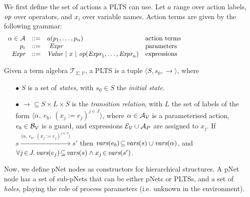 \documentclass[smallcondensed]{svjour3}
\newcommand{\noteSB}[2][color=green!40, size=\tiny]{\todo[#1]{{\bf Simon: } {#2}}}
\newcommand{\cT}{\ensuremath{\mathcal{T}}}
\newcommand{\cV}{\ensuremath{\mathcal{V}}}
\newcommand{\signature}{\ensuremath{\Sigma}}
\newcommand{\variables}{\ensuremath{\cV}}
\newcommand{\Talg}{\ensuremath{\cT_{\signature,\variables}}}
\def\AlgE{\mathcal{E}}
\def\AlgA{\mathcal{A}}
\def\AlgB{\mathcal{B}}
\begin{document}
We first define the set of actions a PLTS can use.  Let $a$
range over action labels, $\symb{op}$ over operators, and $x_i$  over
variable names. Action terms are given by the following grammar:
\[
\begin{array}[l]{rcl@{\quad}p{5.5cm}}
\alpha\in\AlgA&::=&a(p_1,\ldots,p_n)&\text{action terms}\\
p_i&::=& ~\symb{Expr}&\text{parameters}\\
\symb{Expr}&::=& \symb{Value}~|~x~|~\symb{op}(\symb{Expr}_1,\dots,\symb{Expr}_n)&\text{expressions}
\end{array}
\]

\begin{definition}[PLTS]
	\label{PLTS}
	Given a term algebra $\Talg$, a PLTS is a tuple
	$\langle S,s_0, \to\rangle$, where
	\begin{itemize}
		\item[$\bullet$]
		$S$ is a set of \emph{states}, with $s_0 \in S$ the \emph{initial state}.
		\item[$\bullet$] $\to \subseteq S \times L \times S$ is the \emph{transition relation}, with
		$L$ the set of labels of the form
		$\langle \alpha,~e_b,~(x_j\!:= {e}_j)^{j\in J}\rangle$,
		where $\alpha \in\AlgA_{\P}$ is a parameterised action,
		$e_b \in \AlgB_{\P}$ is a guard, and
		expressions  $\AlgE_{\P}\cup\AlgA_{P}$ are assigned to $x_j$.
		If 
		$s \xrightarrow{\langle \alpha,~e_b,~(x_j\!:= {e}_j)^{j\in
				J}\rangle} s'$ then 
		$\vars(e_b)\!\subseteq\! \vars(s)\cup\vars(\alpha)$, and
		$\forall j\!\in\! J .\,\vars(e_j)\!\subseteq\! \vars(s)\land 
		x_j\!\in\!\vars(s')$.
	\end{itemize}
\end{definition}

Now, we define
pNet nodes as constructors for hierarchical structures.
A pNet node has a set of sub-pNets that can be either pNets or PLTSs, and a
set of \emph{holes}, playing the role of process parameters
(i.e. unknown in the environment).
\end{document}
